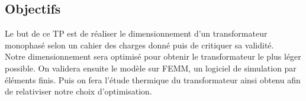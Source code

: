%
%
%
%
%

\subsection{Objectifs}
Le but de ce TP est de réaliser le dimensionnement d'un transformateur monophasé selon un cahier des charges donné puis de critiquer sa validité.\\
Notre dimensionnement sera optimisé pour obtenir le transformateur le plus léger possible. On validera ensuite le modèle sur FEMM, un logiciel de simulation par éléments finis. Puis on fera l'étude thermique du transformateur ainsi obtenu afin de relativiser notre choix d'optimisation.\\